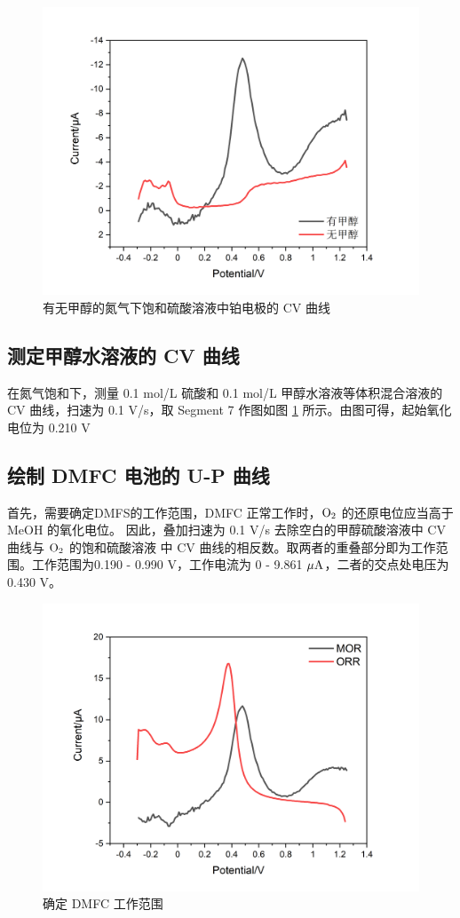 \documentclass[cn,hazy,pku,12pt,normal,math=newtx,cite=super]{elegantnote}
\begin{document}
\begin{figure}[htbp]
    \centering
    \includegraphics[width = .70\textwidth]{image/Graph4.png}
    \caption{有无甲醇的氮气下饱和硫酸溶液中铂电极的 CV 曲线}\label{9}
\end{figure}

\newpage

\subsection{测定甲醇水溶液的 CV 曲线}

在氮气饱和下，测量 0.1 mol/L 硫酸和 0.1 mol/L 甲醇水溶液等体积混合溶液的 CV 曲线，扫速为 0.1 V/s，取 Segment 7 作图如图 \ref{9} 
所示。由图可得，起始氧化电位为 0.210 V


\subsection{绘制 DMFC 电池的 U-P 曲线}

首先，需要确定DMFS的工作范围，DMFC 正常工作时，$\rm O_2$ 的还原电位应当高于 MeOH 的氧化电位。
因此，叠加扫速为 0.1 V/s 去除空白的甲醇硫酸溶液中 CV 曲线与 $\rm O_2$ 的饱和硫酸溶液
中 CV 曲线的相反数。取两者的重叠部分即为工作范围。工作范围为0.190 - 0.990 V，工作电流为 0 - 9.861 $\rm \mu A$，二者的交点处电压为 0.430 V。


\begin{figure}[htbp]
    \centering
    \includegraphics[width = .70\textwidth]{image/Graph8.png}
    \caption{确定 DMFC 工作范围}\label{10}
\end{figure}
\end{document}
